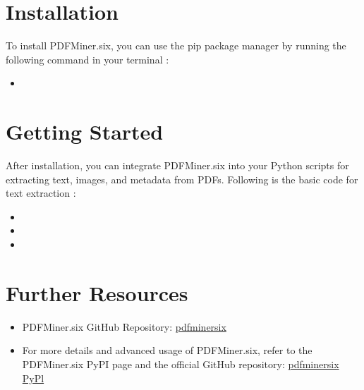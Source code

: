 \section{Installation}

To install PDFMiner.six, you can use the pip package manager by running the following command in your terminal \cite{pdfminersix:2024}:

\begin{itemize}
    \item[] 
\end{itemize}

\section{Getting Started}

After installation, you can integrate PDFMiner.six into your Python scripts for extracting text, images, and metadata from PDFs. Following is the basic code for text extraction \cite{pdfminersix:2024}: 

\begin{itemize}
    \item[] 
    \item[] 
    \item[] 
\end{itemize}


\section{Further Resources}

\begin{itemize}
    \item PDFMiner.six GitHub Repository: \href{https://github.com/pdfminer/pdfminer.six}{pdfminersix}
    \item For more details and advanced usage of PDFMiner.six, refer to the PDFMiner.six PyPI page and the official GitHub repository: \href{https://pdfminersix.readthedocs.io/en/latest/}{pdfminersix PyPl}
\end{itemize}
